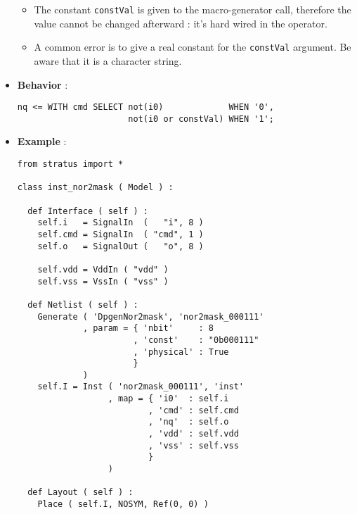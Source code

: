\begin{itemize}
\begin{itemize}
        \item The constant \verb-constVal- is given to the macro-generator call, therefore the value cannot be changed afterward : it's hard wired in the operator.
        \item A common error is to give a real constant for the \verb-constVal- argument. Be aware that it is a character string.
    \end{itemize}
    \item \textbf{Behavior} :
\begin{verbatim}
nq <= WITH cmd SELECT not(i0)             WHEN '0',
                      not(i0 or constVal) WHEN '1';
\end{verbatim}
    \item \textbf{Example} :
\begin{verbatim}
from stratus import *

class inst_nor2mask ( Model ) :

  def Interface ( self ) :
    self.i   = SignalIn  (   "i", 8 )
    self.cmd = SignalIn  ( "cmd", 1 )
    self.o   = SignalOut (   "o", 8 )

    self.vdd = VddIn ( "vdd" )
    self.vss = VssIn ( "vss" )
    
  def Netlist ( self ) :
    Generate ( 'DpgenNor2mask', 'nor2mask_000111'
             , param = { 'nbit'     : 8
                       , 'const'    : "0b000111"
                       , 'physical' : True
                       }
             )
    self.I = Inst ( 'nor2mask_000111', 'inst'
                  , map = { 'i0'  : self.i
                          , 'cmd' : self.cmd
                          , 'nq'  : self.o
                          , 'vdd' : self.vdd
                          , 'vss' : self.vss
                          }
                  )
    
  def Layout ( self ) :
    Place ( self.I, NOSYM, Ref(0, 0) )
\end{verbatim}
\end{itemize}
